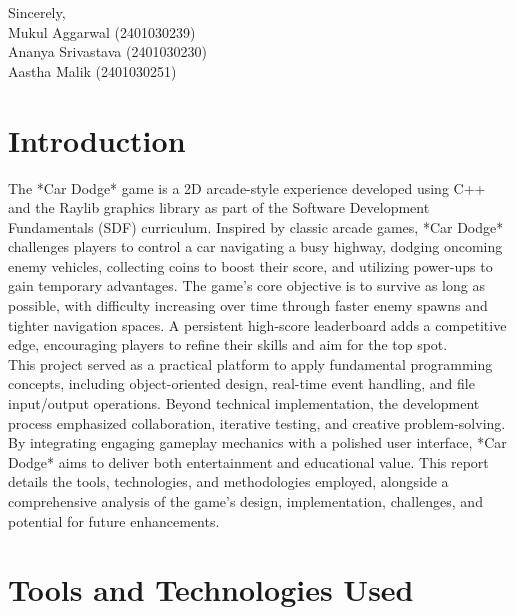 \documentclass[12pt,a4paper]{article}
\begin{document}
\vspace{2em}

\noindent
Sincerely, \\
\vspace{2em}
\noindent
Mukul Aggarwal (2401030239)\\
Ananya Srivastava (2401030230) \\
Aastha Malik (2401030251) \\

\newpage

\tableofcontents

\newpage

\section{Introduction}

The *Car Dodge* game is a 2D arcade-style experience developed using C++ and the Raylib graphics library as part of the Software Development Fundamentals (SDF) curriculum. Inspired by classic arcade games, *Car Dodge* challenges players to control a car navigating a busy highway, dodging oncoming enemy vehicles, collecting coins to boost their score, and utilizing power-ups to gain temporary advantages. The game’s core objective is to survive as long as possible, with difficulty increasing over time through faster enemy spawns and tighter navigation spaces. A persistent high-score leaderboard adds a competitive edge, encouraging players to refine their skills and aim for the top spot. \\

This project served as a practical platform to apply fundamental programming concepts, including object-oriented design, real-time event handling, and file input/output operations. Beyond technical implementation, the development process emphasized collaboration, iterative testing, and creative problem-solving. By integrating engaging gameplay mechanics with a polished user interface, *Car Dodge* aims to deliver both entertainment and educational value. This report details the tools, technologies, and methodologies employed, alongside a comprehensive analysis of the game’s design, implementation, challenges, and potential for future enhancements. \\

\section{Tools and Technologies Used}
\end{document}
